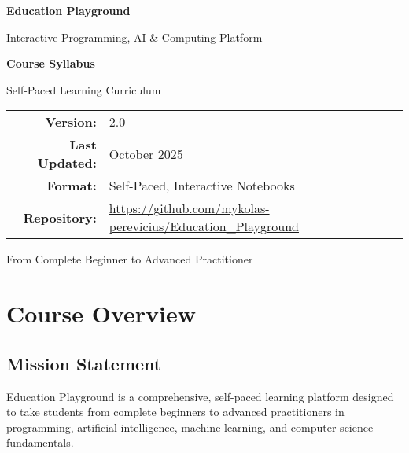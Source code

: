 \documentclass[11pt,letterpaper]{article}
\begin{document}
\begin{titlepage}
    \centering
    \vspace*{2cm}

    {\Huge\bfseries Education Playground\par}
    \vspace{0.5cm}
    {\Large Interactive Programming, AI \& Computing Platform\par}
    \vspace{2cm}

    {\LARGE\textbf{Course Syllabus}\par}
    \vspace{0.5cm}
    {\large Self-Paced Learning Curriculum\par}
    \vspace{3cm}

    \begin{tabular}{rl}
        \textbf{Version:} & 2.0 \\
        \textbf{Last Updated:} & October 2025 \\
        \textbf{Format:} & Self-Paced, Interactive Notebooks \\
        \textbf{Repository:} & \url{https://github.com/mykolas-perevicius/Education\_Playground} \\
    \end{tabular}

    \vfill
    {\large From Complete Beginner to Advanced Practitioner\par}
\end{titlepage}

\tableofcontents
\newpage

\section{Course Overview}

\subsection{Mission Statement}
Education Playground is a comprehensive, self-paced learning platform designed to take students from complete beginners to advanced practitioners in programming, artificial intelligence, machine learning, and computer science fundamentals.
\end{document}
